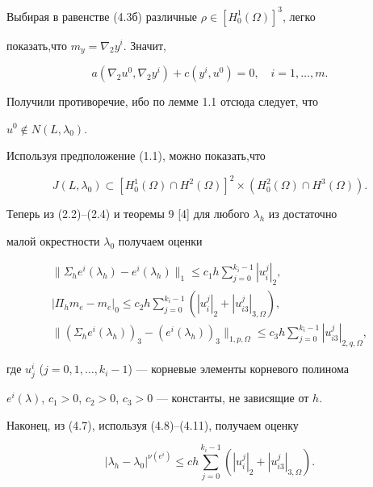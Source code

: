 Выбирая в равенстве (4.3б) различные $\rho \in [H_0^1(\Omega)]^3$, легко


показать,что $m_y=\nabla_2 y^i$. Значит,


$$


a(\nabla_2 u^0,\nabla_2 y^i)+c(y^i,u^0)=0,\quad i=1,\dotsc,m.


$$


Получили противоречие, ибо по лемме 1.1 отсюда следует, что


$u^0\notin N(L,\lambda_0).$





Используя предположение (1.1), можно показать,что


$$


J(L,\lambda_0)\subset[H_0^1(\Omega)\cap H^2(\Omega)]^2\times


(H_0^2(\Omega)\cap H^3(\Omega)).


$$


Теперь из (2.2)--(2.4) и теоремы 9 [4] для любого $\lambda_h$ из достаточно


малой окрестности $\lambda_0$ получаем оценки


\begin{gather}


\|\Sigma_h e^i(\lambda_h)-e^i(\lambda_h)\|_1\le c_1 h\sum_{j=0}^{k_i-1}


|u_i^j|_2,\\


%


|\Pi_h m_e-m_e|_0


\le c_2 h\sum_{j=0}^{k_i-1}(|u_i^j|_2+|u_{i3}^j|_{3,\Omega}), \\


%


\|(\Sigma_h e^i(\lambda_h))_3-(e^i(\lambda_h))_3\|_{1,p,\Omega}


\le c_3 h\sum_{j=0}^{k_i-1}|u_{i3}^j|_{2,q,\Omega},


\end{gather}


где $u_j^i$ ($j=0,1,\dotsc,k_i-1$) --- корневые элементы корневого полинома


$e^i(\lambda)$, $c_1>0$, $c_2>0$, $c_3>0$ --- константы, не зависящие от $h$.


Наконец, из (4.7), используя (4.8)--(4.11), получаем оценку


\begin{equation}


|\lambda_h-\lambda_0|^{\nu(e^i)}


\le c h\sum_{j=0}^{k_i-1}(|u_i^j|_2+|u_{i3}^j|_{3,\Omega}).


\end{equation}



